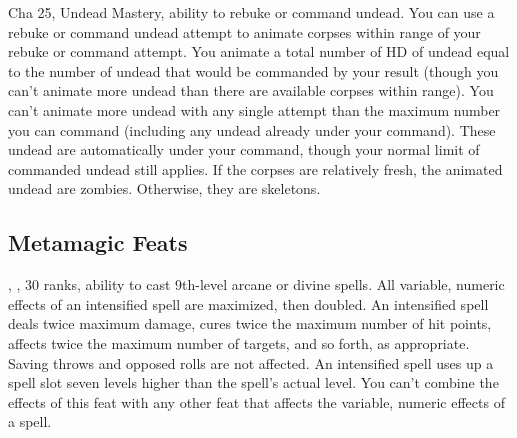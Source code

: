 {Cha 25, Undead Mastery, ability to rebuke or command undead.}
{You can use a rebuke or command undead attempt to animate corpses within range of your rebuke or command attempt. You animate a total number of HD of undead equal to the number of undead that would be commanded by your result (though you can’t animate more undead than there are available corpses within range). You can’t animate more undead with any single attempt than the maximum number you can command (including any undead already under your command). These undead are automatically under your command, though your normal limit of commanded undead still applies. If the corpses are relatively fresh, the animated undead are zombies. Otherwise, they are skeletons.}




\subsection{Metamagic Feats}
{, ,  30 ranks, ability to cast 9th-level arcane or divine spells.}
{All variable, numeric effects of an intensified spell are maximized, then doubled. An intensified spell deals twice maximum damage, cures twice the maximum number of hit points, affects twice the maximum number of targets, and so forth, as appropriate. Saving throws and opposed rolls are not affected. An intensified spell uses up a spell slot seven levels higher than the spell's actual level. You can't combine the effects of this feat with any other feat that affects the variable, numeric effects of a spell.}


\clearpage


\clearpage

